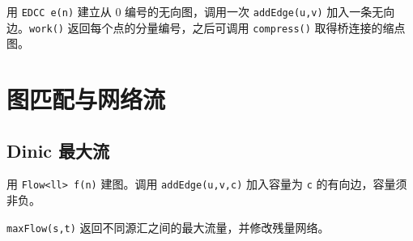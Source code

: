 用 \texttt{EDCC e(n)} 建立从 $0$ 编号的无向图，调用一次 \texttt{addEdge(u,v)} 加入一条无向边。\texttt{work()} 返回每个点的分量编号，之后可调用 \texttt{compress()} 取得桥连接的缩点图。


\section{图匹配与网络流}

\subsection{Dinic 最大流}

用 \texttt{Flow<ll> f(n)} 建图。调用 \texttt{addEdge(u,v,c)} 加入容量为 \texttt{c} 的有向边，容量须非负。

\texttt{maxFlow(s,t)} 返回不同源汇之间的最大流量，并修改残量网络。

